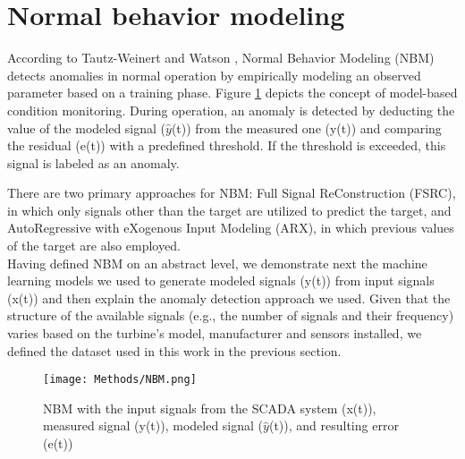 \clearpage

\section{Normal behavior modeling}
According to Tautz-Weinert and Watson \cite{SCADA_NBM_Review}, Normal Behavior Modeling (NBM) detects anomalies in normal operation by empirically modeling an 
observed parameter based on a training phase. Figure \ref{fig:NBM} depicts the concept of model-based condition monitoring.
During operation, an anomaly is detected by deducting the value of the modeled signal ($\hat{y}$(t)) from the measured one (y(t))  and 
comparing the residual (e(t)) with a predefined threshold. If the threshold is exceeded, this signal is labeled as an anomaly. \par
There are two primary approaches for NBM: Full Signal ReConstruction (FSRC), in which only signals other than the target are utilized to predict the target, 
and AutoRegressive with eXogenous Input Modeling (ARX), in which previous values of the target are also employed.\\
Having defined NBM on an abstract level, we demonstrate next the machine learning models we used to generate modeled signals (y(t)) from input signals (x(t)) and 
then explain the anomaly detection approach we used. Given that the structure of the available signals (e.g., the number of signals and their frequency) varies based 
on the turbine's model, manufacturer and sensors installed, we defined the dataset used in this work in the previous section.

\begin{figure}[H]
  \begin{center}
    \texttt{[image: Methods/NBM.png]}
  \end{center}
  \caption{NBM with the input signals from the SCADA system (x(t)), measured signal (y(t)), modeled signal ($\hat{y}$(t)), and resulting error (e(t))}
  \label{fig:NBM}
\end{figure}

